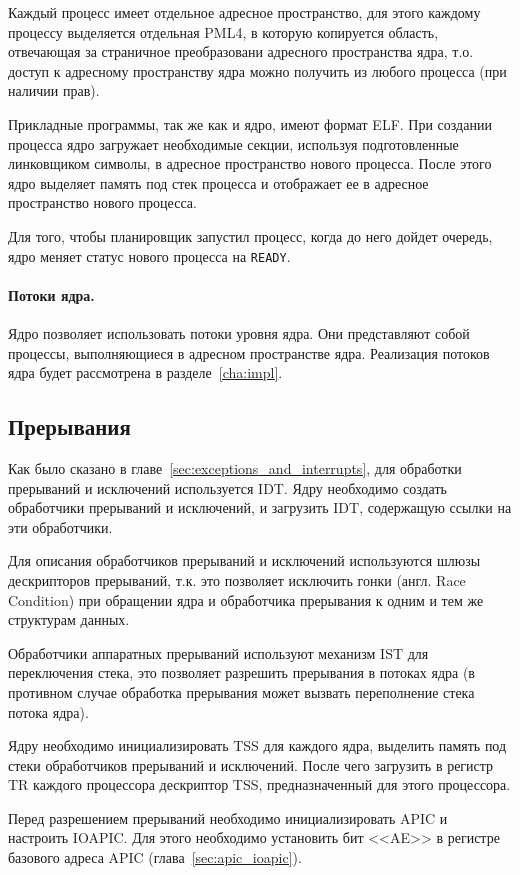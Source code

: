 Каждый процесс имеет отдельное адресное пространство, для этого каждому процессу выделяется
отдельная PML4, в которую копируется область, отвечающая за страничное преобразовани адресного
пространства ядра, т.о. доступ к адресному пространству ядра можно получить из любого процесса
(при наличии прав).

Прикладные программы, так же как и ядро, имеют формат ELF. При создании процесса
ядро загружает необходимые секции, используя подготовленные линковщиком символы, в адресное
пространство нового процесса. После этого ядро выделяет память под стек процесса и отображает
ее в адресное пространство нового процесса.

Для того, чтобы планировщик запустил процесс, когда до него дойдет очередь, ядро
меняет статус нового процесса на \texttt{READY}.

\paragraph{Потоки ядра.} Ядро позволяет использовать потоки уровня ядра.
Они представляют собой процессы, выполняющиеся в адресном пространстве ядра.
Реализация потоков ядра будет рассмотрена в разделе~\ref{cha:impl}.

\subsection{Прерывания}
Как было сказано в главе~\ref{sec:exceptions_and_interrupts}, для обработки прерываний
и исключений используется IDT. Ядру необходимо создать обработчики прерываний и исключений,
и загрузить IDT, содержащую ссылки на эти обработчики.

Для описания обработчиков прерываний и исключений используются шлюзы дескрипторов прерываний,
т.к. это позволяет исключить гонки (англ. Race Condition) при обращении ядра и обработчика
прерывания к одним и тем же структурам данных.

Обработчики аппаратных прерываний используют механизм IST для переключения стека, это позволяет
разрешить прерывания в потоках ядра (в противном случае обработка прерывания может вызвать
переполнение стека потока ядра).

Ядру необходимо инициализировать TSS для каждого ядра, выделить память под стеки обработчиков
прерываний и исключений. После чего загрузить в регистр TR каждого процессора дескриптор TSS,
предназначенный для этого процессора.

Перед разрешением прерываний необходимо инициализировать APIC и настроить IOAPIC. Для этого
необходимо установить бит <<AE>> в регистре базового адреса APIC (глава~\ref{sec:apic_ioapic}).

